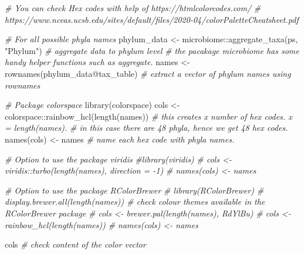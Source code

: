 \documentclass[
]{book}
\newenvironment{Shaded}{\begin{snugshade}}{\end{snugshade}}
\newcommand{\CommentTok}[1]{\textcolor[rgb]{0.56,0.35,0.01}{\textit{#1}}}
\newcommand{\FunctionTok}[1]{\textcolor[rgb]{0.00,0.00,0.00}{#1}}
\newcommand{\NormalTok}[1]{#1}
\newcommand{\OtherTok}[1]{\textcolor[rgb]{0.56,0.35,0.01}{#1}}
\newcommand{\SpecialCharTok}[1]{\textcolor[rgb]{0.00,0.00,0.00}{#1}}
\newcommand{\StringTok}[1]{\textcolor[rgb]{0.31,0.60,0.02}{#1}}
\begin{document}
\begin{Shaded}
\begin{Highlighting}[]
\CommentTok{\# You can check Hex codes with help of https://htmlcolorcodes.com/}
\CommentTok{\# https://www.nceas.ucsb.edu/sites/default/files/2020{-}04/colorPaletteCheatsheet.pdf}

\CommentTok{\# For all possible phyla  names}
\NormalTok{phylum\_data }\OtherTok{\textless{}{-}}\NormalTok{  microbiome}\SpecialCharTok{::}\FunctionTok{aggregate\_taxa}\NormalTok{(ps, }\StringTok{"Phylum"}\NormalTok{) }\CommentTok{\# aggregate data to phylum level }
\CommentTok{\# the pacakage \textquotesingle{}microbiome\textquotesingle{} has some handy helper functions such as \textasciigrave{}aggregate\textasciigrave{}.}
\NormalTok{names }\OtherTok{\textless{}{-}} \FunctionTok{rownames}\NormalTok{(phylum\_data}\SpecialCharTok{@}\NormalTok{tax\_table) }\CommentTok{\# extract a vector of phylum names using \textasciigrave{}rownames\textasciigrave{}}

\CommentTok{\# Package colorspace}
\FunctionTok{library}\NormalTok{(colorspace)}
\NormalTok{cols }\OtherTok{\textless{}{-}}\NormalTok{ colorspace}\SpecialCharTok{::}\FunctionTok{rainbow\_hcl}\NormalTok{(}\FunctionTok{length}\NormalTok{(names)) }\CommentTok{\# this creates x number of hex codes. x = \textasciigrave{}length(names)\textasciigrave{}. }
\CommentTok{\#  in this case there are 48 phyla, hence we get 48 hex codes. }
\FunctionTok{names}\NormalTok{(cols) }\OtherTok{\textless{}{-}}\NormalTok{ names  }\CommentTok{\# name each hex code with phyla names. }

\CommentTok{\# Option to use the package  viridis}
\CommentTok{\#library(viridis)}
\CommentTok{\# cols \textless{}{-} viridis::turbo(length(names), direction = {-}1)}
\CommentTok{\# names(cols) \textless{}{-} names}

\CommentTok{\# Option to use the package RColorBrewer}
\CommentTok{\# library(RColorBrewer)}
\CommentTok{\# display.brewer.all(length(names))  \# check colour themes available in the RColorBrewer package}
\CommentTok{\# cols \textless{}{-} brewer.pal(length(names), \textquotesingle{}RdYlBu\textquotesingle{})}
\CommentTok{\# cols \textless{}{-} rainbow\_hcl(length(names))}
\CommentTok{\# names(cols) \textless{}{-} names}

\NormalTok{cols }\CommentTok{\# check content of the color vector}
\end{Highlighting}
\end{Shaded}
\end{document}
